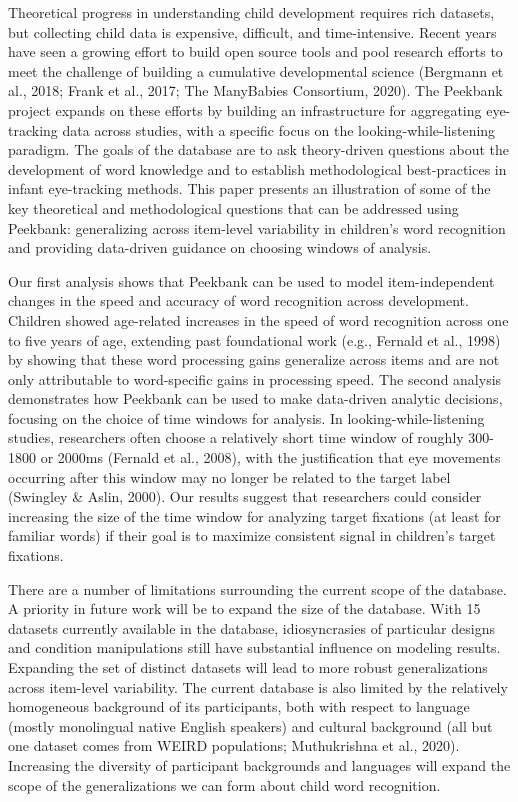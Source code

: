 \documentclass[10pt, letterpaper]{article}
\begin{document}
Theoretical progress in understanding child development requires rich
datasets, but collecting child data is expensive, difficult, and
time-intensive. Recent years have seen a growing effort to build open
source tools and pool research efforts to meet the challenge of building
a cumulative developmental science (Bergmann et al., 2018; Frank et al.,
2017; The ManyBabies Consortium, 2020). The Peekbank project expands on
these efforts by building an infrastructure for aggregating eye-tracking
data across studies, with a specific focus on the
looking-while-listening paradigm. The goals of the database are to ask
theory-driven questions about the development of word knowledge and to
establish methodological best-practices in infant eye-tracking methods.
This paper presents an illustration of some of the key theoretical and
methodological questions that can be addressed using Peekbank:
generalizing across item-level variability in children's word
recognition and providing data-driven guidance on choosing windows of
analysis.

Our first analysis shows that Peekbank can be used to model
item-independent changes in the speed and accuracy of word recognition
across development. Children showed age-related increases in the speed
of word recognition across one to five years of age, extending past
foundational work (e.g., Fernald et al., 1998) by showing that these
word processing gains generalize across items and are not only
attributable to word-specific gains in processing speed. The second
analysis demonstrates how Peekbank can be used to make data-driven
analytic decisions, focusing on the choice of time windows for analysis.
In looking-while-listening studies, researchers often choose a
relatively short time window of roughly 300-1800 or 2000ms (Fernald et
al., 2008), with the justification that eye movements occurring after
this window may no longer be related to the target label (Swingley \&
Aslin, 2000). Our results suggest that researchers could consider
increasing the size of the time window for analyzing target fixations
(at least for familiar words) if their goal is to maximize consistent
signal in children's target fixations.

There are a number of limitations surrounding the current scope of the
database. A priority in future work will be to expand the size of the
database. With 15 datasets currently available in the database,
idiosyncrasies of particular designs and condition manipulations still
have substantial influence on modeling results. Expanding the set of
distinct datasets will lead to more robust generalizations across
item-level variability. The current database is also limited by the
relatively homogeneous background of its participants, both with respect
to language (mostly monolingual native English speakers) and cultural
background (all but one dataset comes from WEIRD populations;
Muthukrishna et al., 2020). Increasing the diversity of participant
backgrounds and languages will expand the scope of the generalizations
we can form about child word recognition.
\end{document}
